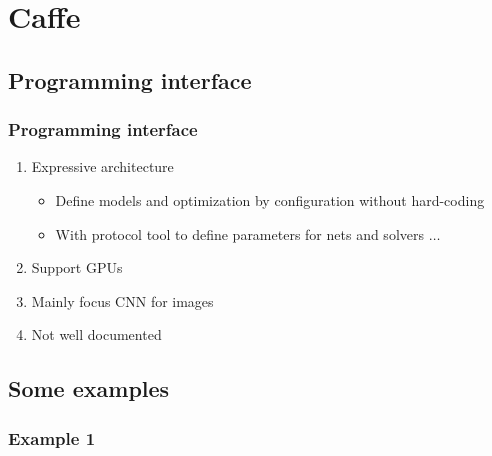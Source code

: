 
\section{Caffe}\label{sec:Caffe}

\subsection{Programming interface}

\begin{frame}
  \MyLogo
  \frametitle{Programming interface}  

\begin{enumerate}
\item Expressive architecture 
\begin{itemize}
\item Define models and optimization by configuration without hard-coding
\item With protocol tool to define parameters for nets and solvers $\ldots$
\end{itemize}
\item Support GPUs 
\item Mainly focus CNN for images
\item Not well documented
\end{enumerate}
\end{frame}

\subsection{Some examples}

\begin{frame}
  \MyLogo
  \frametitle{Example 1}  

\end{frame}